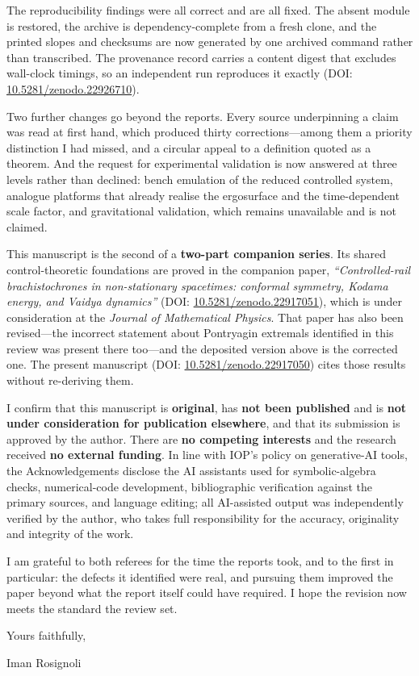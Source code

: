 \documentclass[11pt]{article}
\begin{document}
The reproducibility findings were all correct and are all fixed. The absent module is
restored, the archive is dependency-complete from a fresh clone, and the printed
slopes and checksums are now generated by one archived command rather than
transcribed. The provenance record carries a content digest that excludes wall-clock
timings, so an independent run reproduces it exactly
(DOI: \href{https://doi.org/10.5281/zenodo.22926710}{10.5281/zenodo.22926710}).

Two further changes go beyond the reports. Every source underpinning a claim was read
at first hand, which produced thirty corrections---among them a priority distinction
I had missed, and a circular appeal to a definition quoted as a theorem. And the
request for experimental validation is now answered at three levels rather than
declined: bench emulation of the reduced controlled system, analogue platforms that
already realise the ergosurface and the time-dependent scale factor, and
gravitational validation, which remains unavailable and is not claimed.

This manuscript is the second of a \textbf{two-part companion series}. Its shared
control-theoretic foundations are proved in the companion paper, \emph{``Controlled-rail
brachistochrones in non-stationary spacetimes: conformal symmetry, Kodama energy, and
Vaidya dynamics''}
(DOI: \href{https://doi.org/10.5281/zenodo.22917051}{10.5281/zenodo.22917051}), which
is under consideration at the \emph{Journal of Mathematical Physics}. That paper has
also been revised---the incorrect statement about Pontryagin extremals identified in
this review was present there too---and the deposited version above is the corrected
one. The present manuscript
(DOI: \href{https://doi.org/10.5281/zenodo.22917050}{10.5281/zenodo.22917050}) cites
those results without re-deriving them.

I confirm that this manuscript is \textbf{original}, has \textbf{not been published}
and is \textbf{not under consideration for publication elsewhere}, and that its
submission is approved by the author. There are \textbf{no competing interests} and the
research received \textbf{no external funding}. In line with IOP's policy on
generative-AI tools, the Acknowledgements disclose the AI assistants used for
symbolic-algebra checks, numerical-code development, bibliographic verification against
the primary sources, and language editing; all
AI-assisted output was independently verified by the author, who takes full
responsibility for the accuracy, originality and integrity of the work.

I am grateful to both referees for the time the reports took, and to the first in
particular: the defects it identified were real, and pursuing them improved the paper
beyond what the report itself could have required. I hope the revision now meets the
standard the review set.

\vspace{0.3em}
\noindent Yours faithfully,

\vspace{0.9em}
\noindent Iman Rosignoli
\end{document}
